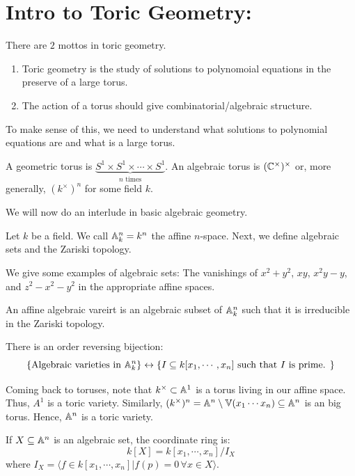 \documentclass[12pt]{article}
\begin{document}



\section{Intro to Toric Geometry:}

There are $2$ mottos in toric geometry. 
\begin{enumerate}
    \item Toric geometry is the study of solutions to polynomoial equations in the preserve of a large torus.
    \item The action of a torus should give combinatorial/algebraic structure.
\end{enumerate}

To make sense of this, we need to understand what solutions to polynomial equations are and what is a large torus. 

A geometric torus is $\underbrace{S^1 \times S^1 \times \cdots \times S^1}_{n \text{ times}}$. An algebraic torus is $(\mathbb C^\times)^\times$ or, more generally, $(k^\times)^n$ for some field $k$. 

We will now do an interlude in basic algebraic geometry. 

Let $k$ be a field. We call $\mathbb A_k^n = k^n$ the affine $n$-space. Next, we define algebraic sets and the Zariski topology. 

We give some examples of algebraic sets: The vanishings of $x^2+y^2$, $xy$, $x^2y-y$, and $z^2-x^2-y^2$ in the appropriate affine spaces. 

\begin{definition}
    An affine algebraic vareirt is an algebraic subset of $\mathbb A^n_k$ such that it is irreducible in the Zariski topology.
\end{definition}

\begin{theorem}[Nullstellensatz]
    There is an order reversing bijection:
    \[ \left\{\text{Algebraic varieties in $\mathbb A^n_k$} \right\} \leftrightarrow \left\{ I \subseteq k[x_1, \cdots, x_n] \text{ such that $I$ is prime. }\right\}\]
\end{theorem}

Coming back to toruses, note that $k^\times \subset \mathbb A^1$ is a torus living in our affine space. Thus, $A^1$ is a toric variety. Similarly, $(k^\times)^n = \mathbb A^n \setminus \mathbb V(x_1\cdots x_n) \subseteq \mathbb A^n$ is an big torus. Hence, $\mathbb A^n$ is a toric variety. 

\begin{definition}
    If $X \subseteq \mathbb A^n$ is an algebraic set, the coordinate ring is: 
    \[ k[X] = k[x_1,\cdots, x_n]/I_X\]
    where $I_X = \langle f \in k[x_1, \cdots, x_n] | f(p) = 0 \, \forall x \in X \rangle$.
\end{definition}
\end{document}

